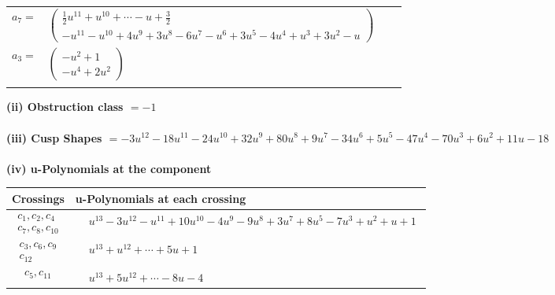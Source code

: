 \documentclass[1p]{elsarticle_modified}
\theoremstyle{definition}
\begin{document}
\begin{tabular}{m{7pt} m{180pt} m{7pt} m{180pt} }
\flushright $a_{7}=$&$\begin{pmatrix}\frac{1}{2} u^{11}+u^{10}+\cdots- u+\frac{3}{2}\\- u^{11}- u^{10}+4 u^9+3 u^8-6 u^7- u^6+3 u^5-4 u^4+u^3+3 u^2- u\end{pmatrix}$ \\
\flushright $a_{3}=$&$\begin{pmatrix}- u^2+1\\- u^4+2 u^2\end{pmatrix}$\\&\end{tabular}
\flushleft \textbf{(ii) Obstruction class $= -1$}\\~\\
\flushleft \textbf{(iii) Cusp Shapes $= -3 u^{12}-18 u^{11}-24 u^{10}+32 u^9+80 u^8+9 u^7-34 u^6+5 u^5-47 u^4-70 u^3+6 u^2+11 u-18$}\\~\\
\newpage\renewcommand{\arraystretch}{1}
\flushleft \textbf{(iv) u-Polynomials at the component}\newline \\
\begin{tabular}{m{50pt}|m{274pt}}
Crossings & \hspace{64pt}u-Polynomials at each crossing \\
\hline $$\begin{aligned}c_{1},c_{2},c_{4}\\c_{7},c_{8},c_{10}\end{aligned}$$&$\begin{aligned}
&u^{13}-3 u^{12}- u^{11}+10 u^{10}-4 u^9-9 u^8+3 u^7+8 u^5-7 u^3+u^2+u+1
\end{aligned}$\\
\hline $$\begin{aligned}c_{3},c_{6},c_{9}\\c_{12}\end{aligned}$$&$\begin{aligned}
&u^{13}+u^{12}+\cdots+5 u+1
\end{aligned}$\\
\hline $$\begin{aligned}c_{5},c_{11}\end{aligned}$$&$\begin{aligned}
&u^{13}+5 u^{12}+\cdots-8 u-4
\end{aligned}$\\
\hline
\end{tabular}\\~\\
\end{document}
